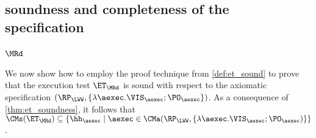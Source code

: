 \subsection{soundness and completeness of the specification}

\subsubsection{\( \MRd \)}

\label{sec:sound-complete-mr}

We now show how to employ the proof technique from \cref{def:et_sound} to prove that the execution 
test $\ET_\MRd$ is sound with respect to the axiomatic specification $(\RP_{\LWW}, \{\lambda \aexec. \VIS_{\aexec} ; \PO_{\aexec} \})$. 
As a consequence of \cref{thm:et_soundness}, it follows that $\CMs(\ET_{\MRd}) \subseteq \{ \hh_{\aexec} \mid \aexec \in \CMa(\RP_{\LWW}, 
\{\lambda \aexec. \VIS_{\aexec} ; \PO_{\aexec})\} \}$. 


